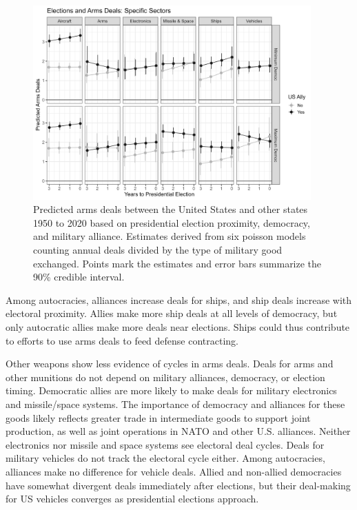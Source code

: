 \documentclass[12pt]{article}
\begin{document}
\begin{figure}[htpb]
	\centering
		\includegraphics[width=0.95\textwidth]{../figures/deals-sector.png}
	\caption{Predicted arms deals between the United States and other states 1950 to 2020 based on presidential election proximity, democracy, and military alliance. Estimates derived from six poisson models counting annual deals divided by the type of military good exchanged. Points mark the estimates and error bars summarize the 90\% credible interval.}
	\label{fig:deals-sector}
\end{figure}


Among autocracies, alliances increase deals for ships, and ship deals increase with electoral proximity. 
Allies make more ship deals at all levels of democracy, but only autocratic allies make more deals near elections. 
Ships could thus contribute to efforts to use arms deals to feed defense contracting. 


Other weapons show less evidence of cycles in arms deals. 
Deals for arms and other munitions do not depend on military alliances, democracy, or election timing. 
Democratic allies are more likely to make deals for military electronics and missile/space systems. 
The importance of democracy and alliances for these goods likely reflects greater trade in intermediate goods to support joint production, as well as joint operations in NATO and other U.S. alliances. 
Neither electronics nor missile and space systems see electoral deal cycles.
Deals for military vehicles do not track the electoral cycle either. 
Among autocracies, alliances make no difference for vehicle deals. 
Allied and non-allied democracies have somewhat divergent deals immediately after elections, but their deal-making for US vehicles converges as presidential elections approach.
\end{document}
